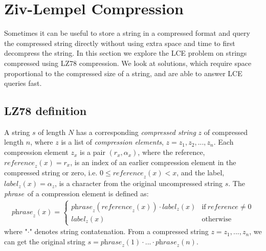 \documentclass[a4]{article}
\begin{document}
\section{Ziv-Lempel Compression\label{sec:lz-compress}}

\newcommand{\zreference}{\textit{reference}}
\newcommand{\zlabel}{\textit{label}}
\newcommand{\zphrase}{\textit{phrase}}

Sometimes it can be useful to store a string in a compressed format and query the compressed string directly without using extra space and time to first decompress the string. In this section we explore the LCE problem on strings compressed using LZ78 compression. We look at solutions, which require space proportional to the compressed size of a string, and are able to answer LCE queries fast.

\subsection{LZ78 definition\label{sec:lz-definition}}
A string $s$ of length $N$ has a corresponding \textit{compressed string} $z$ of compressed length $n$, where $z$ is a list of \textit{compression elements}, $z = z_1, z_2, ..., z_n$. Each compression element $z_x$ is a pair $(r_x, \alpha_x)$, where the reference, $\zreference_z(x)=r_x$, is an index of an earlier compression element in the compressed string or zero, i.e. $0 \leq \zreference_z(x) < x$, and the label, $\zlabel_z(x)=\alpha_z$, is a character from the original uncompressed string $s$. The \zphrase\ of a compression element is defined as:
\begin{align*}
\zphrase_z(x) =
\begin{cases}
    \zphrase_z(\zreference_z(x)) \cdot \zlabel_z(x) & \textrm{if}~ \zreference \neq 0\\
    \zlabel_z(x) & \textrm{otherwise}
\end{cases}
\end{align*}
where "$\cdot$" denotes string contatenation. From a compressed string $z = z_1,...,z_n$, we can get the original string $s=\zphrase_z(1)\cdot...\cdot\zphrase_z(n)$.
\end{document}
